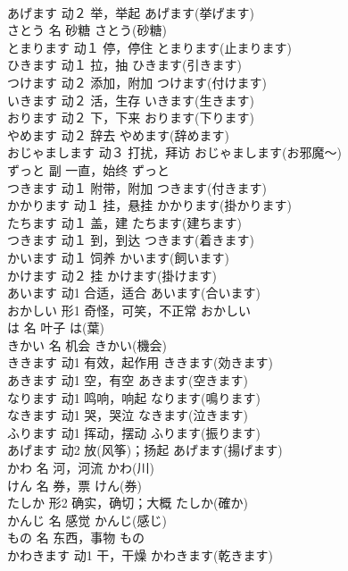 \documentclass[8pt]{extreport}
\begin{document}
\begin{CJK}{UTF8}{min}
\\	あげます	动２	举，举起	あげます(挙げます)	
\\	さとう	名	砂糖	さとう(砂糖)	
\\	とまります	动１	停，停住	とまります(止まります)	
\\	ひきます	动１	拉，抽	ひきます(引きます)	
\\	つけます	动２	添加，附加	つけます(付けます)	
\\	いきます	动２	活，生存	いきます(生きます)	
\\	おります	动２	下，下来	おります(下ります)	
\\	やめます	动２	辞去	やめます(辞めます)	
\\	おじゃまします	动３	打扰，拜访	おじゃまします(お邪魔～)	
\\	ずっと	副	一直，始终	ずっと	
\\	つきます	动１	附带，附加	つきます(付きます)	
\\	かかります	动１	挂，悬挂	かかります(掛かります)	
\\	たちます	动１	盖，建	たちます(建ちます)	
\\	つきます	动１	到，到达	つきます(着きます)	
\\	かいます	动１	饲养	かいます(飼います)	
\\	かけます	动２	挂	かけます(掛けます)	
\\	あいます	动1	合适，适合	あいます(合います)	
\\	おかしい	形1	奇怪，可笑，不正常	おかしい	
\\	は	名	叶子	は(葉)	
\\	きかい	名	机会	きかい(機会)	
\\	ききます	动1	有效，起作用	ききます(効きます)	
\\	あきます	动1	空，有空	あきます(空きます)	
\\	なります	动1	鸣响，响起	なります(鳴ります)	
\\	なきます	动1	哭，哭泣	なきます(泣きます)	
\\	ふります	动1	挥动，摆动	ふります(振ります)	
\\	あげます	动2	放(风筝)；扬起	あげます(揚げます)	
\\	かわ	名	河，河流	かわ(川)	
\\	けん	名	券，票	けん(券)	
\\	たしか	形2	确实，确切；大概	たしか(確か)	
\\	かんじ	名	感觉	かんじ(感じ)	
\\	もの	名	东西，事物	もの	
\\	かわきます	动1	干，干燥	かわきます(乾きます)	

\end{CJK}
\end{document}
